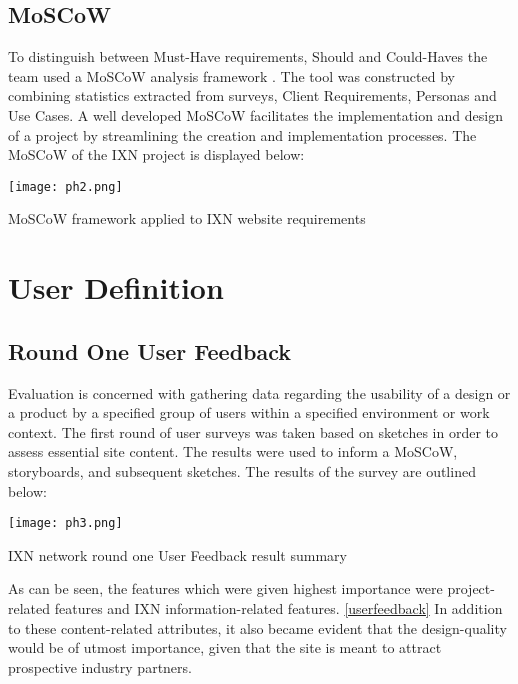 \documentclass[fontsize=11pt]{extarticle}
\numberwithin{figure}{section} %
\begin{document}
\hypertarget{moscow}{%
\subsection{MoSCoW}\label{moscow}}

To distinguish between Must-Have requirements, Should and Could-Haves
the team used a MoSCoW analysis framework \cite{g4}. The tool was
constructed by combining statistics extracted from surveys, Client
Requirements, Personas and Use Cases. A well developed MoSCoW
facilitates the implementation and design of a project by streamlining
the creation and implementation processes. The MoSCoW of the IXN project
is displayed below:

\newpage

\begin{landscape}
\begin{table}[H]
      \centering
      \texttt{[image: ph2.png]}
      \caption{MoSCoW framework applied to IXN website requirements}
 \end{table}
 \end{landscape}

\hypertarget{user-definition}{%
\section{User Definition}\label{user-definition}}

\hypertarget{round-one-user-feedback}{%
\subsection{Round One User Feedback}\label{round-one-user-feedback}}

Evaluation is concerned with gathering data regarding the usability of a
design or a product by a specified group of users within a specified
environment or work context. The first round of user surveys was taken
based on sketches in order to assess essential site content. The results
were used to inform a MoSCoW, storyboards, and subsequent sketches. The
results of the survey are outlined below:

\begin{table}[H]
      \centering
      \texttt{[image: ph3.png]}
      \caption{IXN network round one User Feedback result summary}
\label{userfeedback}
 \end{table}

As can be seen, the features which were given highest importance were
project-related features and IXN information-related features.
\ref{userfeedback} In addition to these content-related attributes, it
also became evident that the design-quality would be of utmost
importance, given that the site is meant to attract prospective industry
partners.
\end{document}
